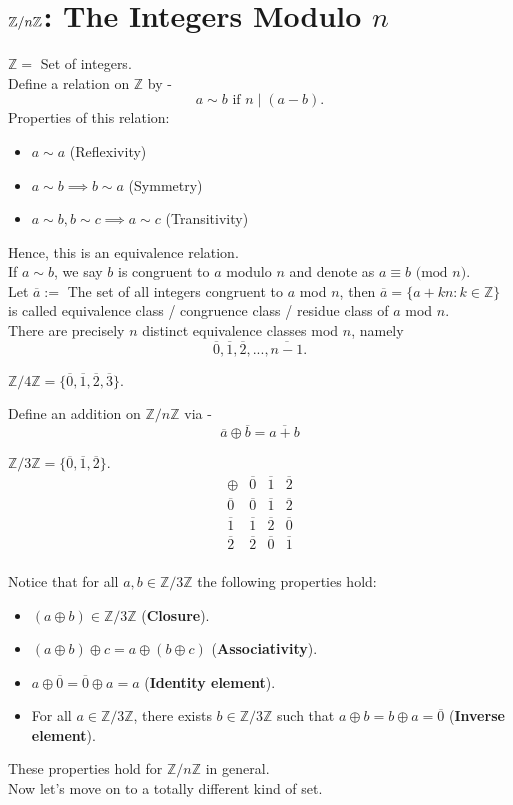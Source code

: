\section{$\mathbb{Z}/n\mathbb{Z}$: The Integers Modulo $n$}
$\mathbb{Z} =$ Set of integers.\\
Define a relation on $\mathbb{Z}$ by -
$$
a \sim b \text{ if } n \mid (a - b).
$$
Properties of this relation:
\begin{itemize}
    \item $a \sim a$ (Reflexivity)
    \item $a \sim b \implies b \sim a$ (Symmetry)
    \item $a \sim b, b \sim c \implies a \sim c$ (Transitivity)
\end{itemize}
Hence, this is an equivalence relation.\\
If $a \sim b$, we say $b$ is congruent to $a$ modulo $n$ and denote as $a \equiv b \text{ (mod }n)$.\\
Let $\overline{a} :=$ The set of all integers congruent to $a$ mod $n$, then $\overline{a} = \{a + kn: k \in \mathbb{Z}\}$ is called equivalence class / congruence class / residue class of $a$ mod $n$.\\
There are precisely $n$ distinct equivalence classes mod $n$, namely
$$\overline{0}, \overline{1}, \overline{2}, ..., \overline{n-1}.$$
\begin{eg}
    $\mathbb{Z}/4\mathbb{Z} = \{\overline{0}, \overline{1}, \overline{2}, \overline{3}\}.$
\end{eg}
Define an addition on $\mathbb{Z}/n\mathbb{Z}$ via -
$$\overline{a} \oplus \overline{b} = \overline{a+b}$$
\begin{eg}
    $\mathbb{Z}/3\mathbb{Z} = \{\overline{0}, \overline{1}, \overline{2}\}.$
    \[
    \begin{array}{c|ccc}
        \oplus       & \overline{0} & \overline{1} & \overline{2}\\
        \hline
        \overline{0} & \overline{0} & \overline{1} & \overline{2}\\
        \overline{1} & \overline{1} & \overline{2} & \overline{0}\\
        \overline{2} & \overline{2} & \overline{0} & \overline{1}\\
    \end{array}
    \]
\end{eg}
Notice that for all $a, b \in \mathbb{Z}/3\mathbb{Z}$ the following properties hold:
\begin{itemize}
    \item $(a \oplus b) \in \mathbb{Z}/3\mathbb{Z}$ (\textbf{Closure}).
    \item $(a \oplus b) \oplus c = a \oplus (b \oplus c)$ (\textbf{Associativity}).
    \item $a \oplus \overline{0} = \overline{0} \oplus a = a$ (\textbf{Identity element}).
    \item For all $a \in \mathbb{Z}/3\mathbb{Z}$, there exists $b \in \mathbb{Z}/3\mathbb{Z}$ such that $a \oplus b = b \oplus a = \overline{0}$ (\textbf{Inverse element}).
\end{itemize}
These properties hold for $\mathbb{Z}/n\mathbb{Z}$ in general.\\
Now let's move on to a totally different kind of set.
